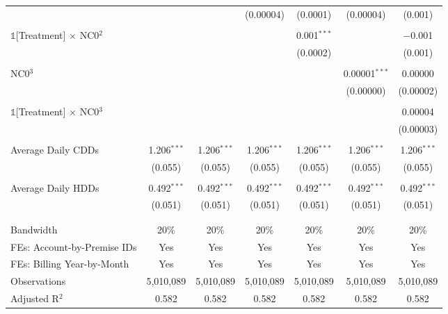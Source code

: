 {\begin{table}[t!]
\begin{adjustbox}{scale = 0.95}
\begin{threeparttable}
\begin{tabular}{@{\extracolsep{15pt}}lcccccc}
                     &  &  & (0.00004) & (0.0001) & (0.00004) & (0.001) \\ 
                     & & & & & & \\ 
                    $\mathbb{1}$[Treatment] $\times$ NC0$^{2}$ &  &  &  & 0.001$^{***}$ &  & $-$0.001 \\ 
                     &  &  &  & (0.0002) &  & (0.001) \\ 
                     & & & & & & \\ 
                    NC0$^{3}$ &  &  &  &  & 0.00001$^{***}$ & 0.00000 \\ 
                     &  &  &  &  & (0.00000) & (0.00002) \\ 
                     & & & & & & \\ 
                    $\mathbb{1}$[Treatment] $\times$ NC0$^{3}$ &  &  &  &  &  & 0.00004 \\ 
                     &  &  &  &  &  & (0.00003) \\ 
                     & & & & & & \\ 
                    Average Daily CDDs & 1.206$^{***}$ & 1.206$^{***}$ & 1.206$^{***}$ & 1.206$^{***}$ & 1.206$^{***}$ & 1.206$^{***}$ \\ 
                     & (0.055) & (0.055) & (0.055) & (0.055) & (0.055) & (0.055) \\ 
                     & & & & & & \\ 
                    Average Daily HDDs & 0.492$^{***}$ & 0.492$^{***}$ & 0.492$^{***}$ & 0.492$^{***}$ & 0.492$^{***}$ & 0.492$^{***}$ \\ 
                     & (0.051) & (0.051) & (0.051) & (0.051) & (0.051) & (0.051) \\ 
                     & & & & & & \\
                    \hline
                    \\[-2.0ex]
                    Bandwidth & 20\% & 20\% & 20\% & 20\% & 20\% & 20\% \\ 
                    FEs: Account-by-Premise IDs & Yes & Yes & Yes & Yes & Yes & Yes \\ 
                    FEs: Billing Year-by-Month & Yes & Yes & Yes & Yes & Yes & Yes \\ 
                    Observations & 5,010,089 & 5,010,089 & 5,010,089 & 5,010,089 & 5,010,089 & 5,010,089 \\ 
                    Adjusted R$^{2}$ & 0.582 & 0.582 & 0.582 & 0.582 & 0.582 & 0.582 \\ 

\end{tabular}
\end{threeparttable}
\end{adjustbox}
\end{table}}
